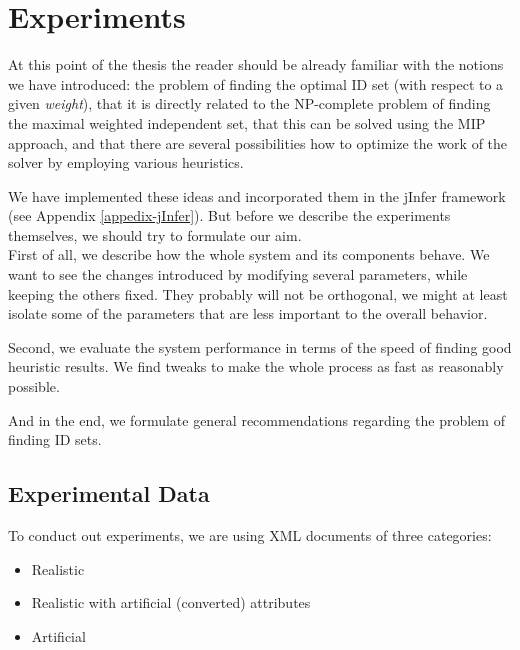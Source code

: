 \chapter{Experiments}


At this point of the thesis the reader should be already familiar with the notions we have introduced: the problem of finding the optimal ID set (with respect to a given \textit{weight}), that it is directly related to the NP-complete problem of finding the maximal weighted independent set, that this can be solved using the MIP approach, and that there are several possibilities how to optimize the work of the solver by employing various heuristics.

We have implemented these ideas and incorporated them in the jInfer framework (see Appendix \ref{appedix-jInfer}). But before we describe the experiments themselves, we should try to formulate our aim.\\

First of all, we describe how the whole system and its components behave. We want to see the changes introduced by modifying several parameters, while keeping the others fixed. They probably will not be orthogonal, we might at least isolate some of the parameters that are less important to the overall behavior.

Second, we evaluate the system performance in terms of the speed of finding good heuristic results. We find tweaks to make the whole process as fast as reasonably possible.

And in the end, we formulate general recommendations regarding the problem of finding ID sets.

\section{Experimental Data}
\label{section-experiments-data}

To conduct out experiments, we are using XML documents of three categories:

\begin{itemize}
	\item Realistic
	\item Realistic with artificial (converted) attributes
	\item Artificial
\end{itemize}

